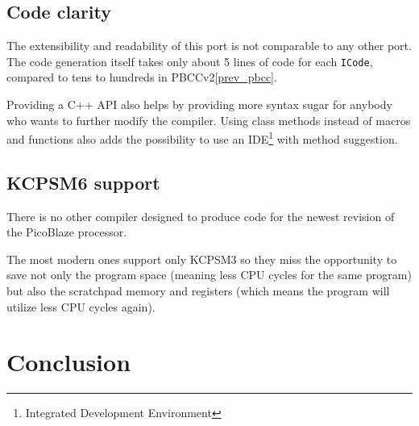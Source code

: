 \section{Code clarity}

The extensibility and readability of this port is not comparable to any other port. The code generation itself takes only about 5 lines of code for each \texttt{ICode}, compared to tens to hundreds in PBCCv2\ref{prev_pbcc}.

Providing a C++ API also helps by providing more syntax sugar for anybody who wants to further modify the compiler. Using class methods instead of macros and functions also adds the possibility to use an IDE\footnote{Integrated Development Environment} with method suggestion.

\section{KCPSM6 support}

There is no other compiler designed to produce code for the newest revision of the PicoBlaze processor.

The most modern ones support only KCPSM3 so they miss the opportunity to save not only the program space (meaning less CPU cycles for the same program) but also the scratchpad memory and registers (which means the program will utilize less CPU cycles again).

\chapter{Conclusion}\label{conclusion}


\cite{TBD}

